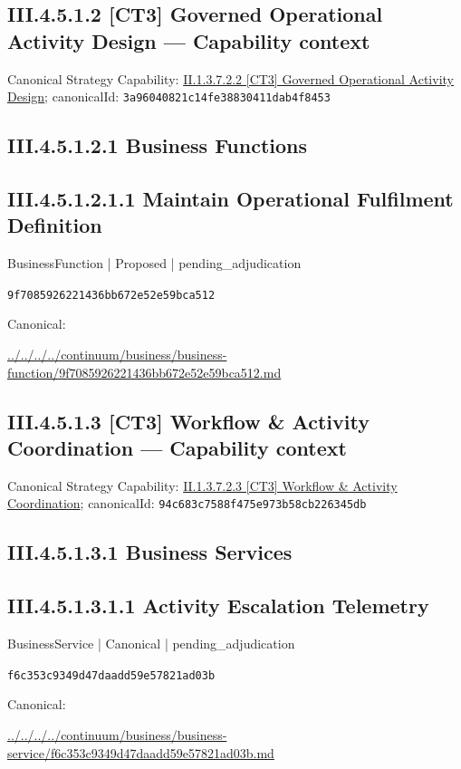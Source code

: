 \documentclass[10pt,a4paper]{article}
\begin{document}
\subsection*{III.4.5.1.2 [CT3] Governed Operational Activity Design — Capability context}
Canonical Strategy Capability: \hyperref[element-3a96040821c14fe38830411dab4f8453]{II.1.3.7.2.2 [CT3] Governed Operational Activity Design}; canonicalId: \texttt{3a96040821c14fe38830411dab4f8453}\par
\subsection*{III.4.5.1.2.1 Business Functions}
\subsection*{III.4.5.1.2.1.1 Maintain Operational Fulfilment Definition}
\label{element-9f7085926221436bb672e52e59bca512}
{\small BusinessFunction | Proposed | pending\_adjudication}\par
\texttt{9f7085926221436bb672e52e59bca512}\par
Canonical: \par
{\footnotesize\url{../../../../continuum/business/business-function/9f7085926221436bb672e52e59bca512.md}}\par
\subsection*{III.4.5.1.3 [CT3] Workflow \& Activity Coordination — Capability context}
Canonical Strategy Capability: \hyperref[element-94c683c7588f475e973b58cb226345db]{II.1.3.7.2.3 [CT3] Workflow \& Activity Coordination}; canonicalId: \texttt{94c683c7588f475e973b58cb226345db}\par
\subsection*{III.4.5.1.3.1 Business Services}
\subsection*{III.4.5.1.3.1.1 Activity Escalation Telemetry}
\label{element-f6c353c9349d47daadd59e57821ad03b}
{\small BusinessService | Canonical | pending\_adjudication}\par
\texttt{f6c353c9349d47daadd59e57821ad03b}\par
Canonical: \par
{\footnotesize\url{../../../../continuum/business/business-service/f6c353c9349d47daadd59e57821ad03b.md}}\par
\end{document}
